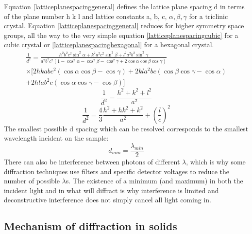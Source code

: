 Equation \ref{latticeplanespacinggeneral} defines the lattice plane spacing d in terms of the plane number h k l and lattice constants a, b, c, $\alpha, \beta, \gamma$ for a triclinic crystal. Equation \ref{latticeplanespacinggeneral} reduces for higher symmetry space groups, all the way to the very simple equation \ref{latticeplanespacingcubic} for a cubic crystal or \ref{latticeplanespacinghexagonal} for a hexagonal crystal.
\begin{multline}
    \frac{1}{d^2}=\frac{h^2b^2c^2\sin^2{\alpha}+k^2a^2c^2\sin^2{\beta}+l^2a^2b^2\sin^2{\gamma}}{a^2b^2c^2(1-\cos^2{\alpha}-\cos^2{\beta}-\cos^2{\gamma}+2\cos{\alpha}\cos{\beta}\cos{\gamma})}\\\times[2hkabc^2(\cos{\alpha}\cos{\beta}-\cos{\gamma})+2kla^2bc(\cos{\beta}\cos{\gamma}-\cos{\alpha})\\+2hlab^2c(\cos{\alpha}\cos{\gamma}-\cos{\beta})]
    \label{latticeplanespacinggeneral}
    \end{multline}
\begin{equation}
    \frac{1}{d^2}=\frac{h^2+k^2+l^2}{a^2}
    \label{latticeplanespacingcubic}
\end{equation}
\begin{equation}
    \frac{1}{d^2}=\frac{4}{3}\frac{h^2+hk^2+k^2}{a^2}+\left(\frac{l}{c}\right)^2
    \label{latticeplanespacinghexagonal}
\end{equation}
The smallest possible d spacing which can be resolved corresponds to the smallest wavelength incident on the sample:
\begin{equation}
    d_{min}=\frac{\lambda_{min}}{2}
    \label{minspacing}
\end{equation}
There can also be interference between photons of different $\lambda$, which is why some diffraction techniques use filters and specific detector voltages to reduce the number of possible $\lambda$s. The existence of a minimum (and maximum) in both the incident light and in what will diffract is why interference is limited and deconstructive interference does not simply cancel all light coming in.

\subsection{Mechanism of diffraction in solids}
